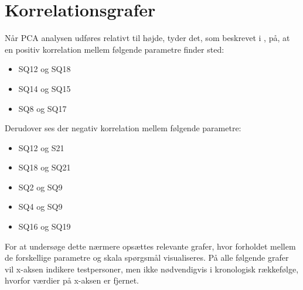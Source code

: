 \section{Korrelationsgrafer}
\label{DatabehandlingKorrelationsgrafer}
%
Når PCA analysen udføres relativt til højde, tyder det, som beskrevet i , på, at en positiv korrelation mellem følgende parametre finder sted:
\begin{itemize}
	\item SQ12 og SQ18
	\item SQ14 og SQ15
	\item SQ8 og SQ17
\end{itemize}
%
Derudover ses der negativ korrelation mellem følgende parametre:
\begin{itemize}
	\item SQ12 og S21
	\item SQ18 og SQ21
	\item SQ2 og SQ9
	\item SQ4 og SQ9
	\item SQ16 og SQ19
\end{itemize}
%
For at undersøge dette nærmere opsættes relevante grafer, hvor forholdet mellem de forskellige parametre og skala spørgsmål visualiseres. På alle følgende grafer vil x-aksen indikere testpersoner, men ikke nødvendigvis i kronologisk rækkefølge, hvorfor værdier på x-aksen er fjernet.

